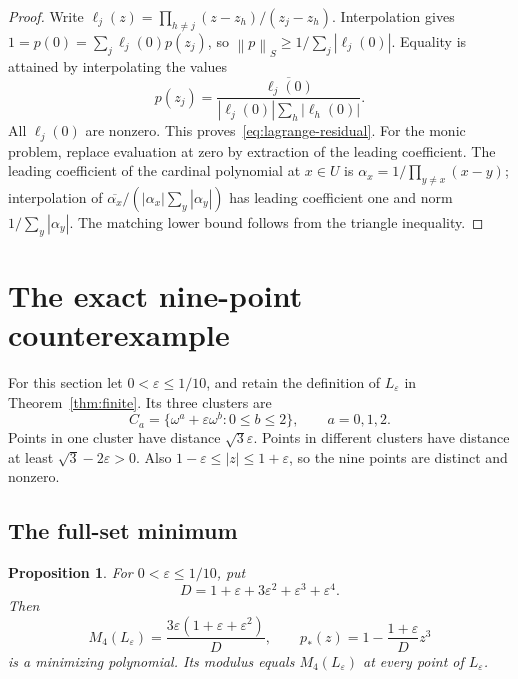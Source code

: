 \documentclass[11pt,a4paper]{article}
\newtheorem{proposition}[theorem]{Proposition}
\theoremstyle{remark}
\newcommand{\norm}[1]{\left\lVert#1\right\rVert}
\newcommand{\eps}{\varepsilon}
\newcommand{\om}{\omega}
\begin{document}
\begin{proof}
Write $\ell_j(z)=\prod_{h\ne j}(z-z_h)/(z_j-z_h)$.
Interpolation gives $1=p(0)=\sum_j\ell_j(0)p(z_j)$, so
$\norm{p}_S\ge1/\sum_j|\ell_j(0)|$.
Equality is attained by interpolating the values
\[
 p(z_j)=\frac{\overline{\ell_j(0)}}{|\ell_j(0)|\sum_h|\ell_h(0)|}.
\]
All $\ell_j(0)$ are nonzero. This proves~\eqref{eq:lagrange-residual}.
For the monic problem, replace evaluation at zero by extraction of the leading
coefficient. The leading coefficient of the cardinal polynomial at $x\in U$
is $\alpha_x=1/\prod_{y\ne x}(x-y)$; interpolation of
$\overline{\alpha_x}/(|\alpha_x|\sum_y|\alpha_y|)$ has leading coefficient
one and norm $1/\sum_y|\alpha_y|$. The matching lower bound follows from the
triangle inequality.
\end{proof}

\section{The exact nine-point counterexample}
For this section let $0<\eps\le1/10$, and retain the definition of $L_\eps$
in Theorem~\ref{thm:finite}. Its three clusters are
\[
 C_a=\{\om^a+\eps\om^b:0\le b\le2\},\qquad a=0,1,2.
\]
Points in one cluster have distance $\sqrt3\eps$. Points in different clusters
have distance at least $\sqrt3-2\eps>0$. Also
$1-\eps\le|z|\le1+\eps$, so the nine points are distinct and nonzero.

\subsection{The full-set minimum}
\begin{proposition}\label{prop:exact-M}
For $0<\eps\le1/10$, put
\[
 D=1+\eps+3\eps^2+\eps^3+\eps^4.
\]
Then
\begin{equation}\label{eq:full-M}
 M_4(L_\eps)=\frac{3\eps(1+\eps+\eps^2)}{D},
 \qquad
 p_*(z)=1-\frac{1+\eps}{D}z^3
\end{equation}
is a minimizing polynomial. Its modulus equals $M_4(L_\eps)$ at every point
of $L_\eps$.
\end{proposition}
\end{document}
